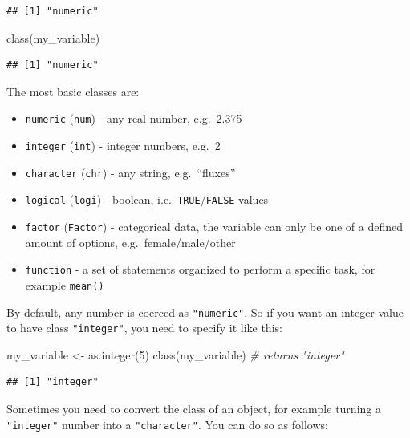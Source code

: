 \documentclass[
]{book}
\newenvironment{Shaded}{\begin{snugshade}}{\end{snugshade}}
\newcommand{\CommentTok}[1]{\textcolor[rgb]{0.56,0.35,0.01}{\textit{#1}}}
\newcommand{\DecValTok}[1]{\textcolor[rgb]{0.00,0.00,0.81}{#1}}
\newcommand{\FunctionTok}[1]{\textcolor[rgb]{0.00,0.00,0.00}{#1}}
\newcommand{\NormalTok}[1]{#1}
\newcommand{\OtherTok}[1]{\textcolor[rgb]{0.56,0.35,0.01}{#1}}
\providecommand{\tightlist}{%
  \setlength{\itemsep}{0pt}\setlength{\parskip}{0pt}}
\begin{document}
\begin{verbatim}
## [1] "numeric"
\end{verbatim}

\begin{Shaded}
\begin{Highlighting}[]
\FunctionTok{class}\NormalTok{(my\_variable)}
\end{Highlighting}
\end{Shaded}

\begin{verbatim}
## [1] "numeric"
\end{verbatim}

The most basic classes are:

\begin{itemize}
\tightlist
\item
  \texttt{numeric} (\texttt{num}) - any real number, e.g.~2.375
\item
  \texttt{integer} (\texttt{int}) - integer numbers, e.g.~2
\item
  \texttt{character} (\texttt{chr}) - any string, e.g.~``fluxes''
\item
  \texttt{logical} (\texttt{logi}) - boolean, i.e.~\texttt{TRUE}/\texttt{FALSE} values
\item
  \texttt{factor} (\texttt{Factor}) - categorical data, the variable can only be one of a defined amount of options, e.g.~female/male/other
\item
  \texttt{function} - a set of statements organized to perform a specific task, for example \texttt{mean()}
\end{itemize}

By default, any number is coerced as \texttt{"numeric"}. So if you want an integer value to have class \texttt{"integer"}, you need to specify it like this:

\begin{Shaded}
\begin{Highlighting}[]
\NormalTok{my\_variable }\OtherTok{\textless{}{-}} \FunctionTok{as.integer}\NormalTok{(}\DecValTok{5}\NormalTok{)}
\FunctionTok{class}\NormalTok{(my\_variable)  }\CommentTok{\# returns "integer"}
\end{Highlighting}
\end{Shaded}

\begin{verbatim}
## [1] "integer"
\end{verbatim}

Sometimes you need to convert the class of an object, for example turning a \texttt{"integer"} number into a \texttt{"character"}. You can do so as follows:
\end{document}
